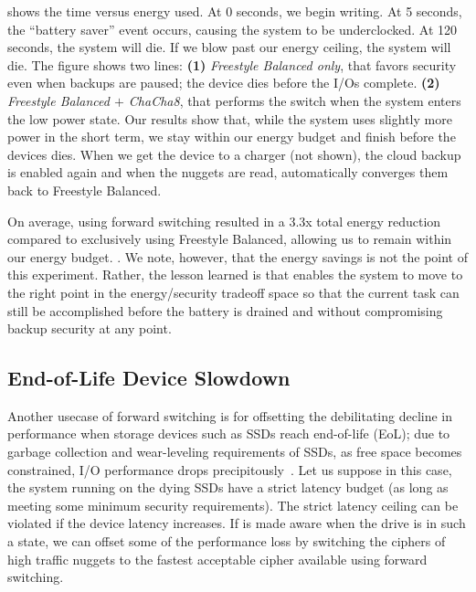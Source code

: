  shows the time versus energy used. At 0 seconds, we
begin writing. At 5 seconds, the ``battery saver'' event occurs, causing the
system to be underclocked. At 120 seconds, the system will die. If we blow past
our energy ceiling, the system will die. The figure shows two lines:
%
{\bf (1)} {\em Freestyle Balanced only}, that favors security even when backups
are paused;  the device dies before the I/Os complete.
%
{\bf (2)} {\em Freestyle Balanced $+$ ChaCha8}, that performs the switch when
the system enters the low power state. Our results show that, while the system
uses slightly more power in the short term, we stay within our energy budget and
finish before the devices dies.
%
When we get the device to a charger (not shown), the cloud backup is enabled
again and when the nuggets are read, \sys automatically converges them back to
Freestyle Balanced.

On average, using forward switching resulted in a 3.3x total energy reduction
compared to exclusively using Freestyle Balanced, allowing us to remain within
our energy budget. .  We note, however, that the energy savings is not
the point of this experiment. Rather, the lesson learned is that \sys enables
the system to move to the right point in the energy/security tradeoff space so
that the current task can still be accomplished before the battery is drained
and without compromising backup security at any point.


\subsection{End-of-Life Device Slowdown}\label{subsec:uc3}

Another usecase of forward switching is for offsetting the debilitating decline
in performance when storage devices such as SSDs reach end-of-life (EoL); due to
garbage collection and wear-leveling requirements of SSDs, as free space becomes
constrained, I/O performance drops precipitously~\cite{SSDEOL1}.  Let us suppose
in this case, the system running on the dying SSDs have a strict latency budget
(as long as meeting some minimum security requirements).  The strict latency
ceiling can be violated if the device latency increases.  If \sys is made aware
when the drive is in such a state, we can offset some of the performance loss by
switching the ciphers of high traffic nuggets to the fastest acceptable cipher
available using forward switching.

